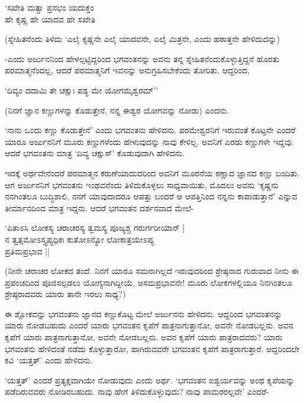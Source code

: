 \begin{shloka}
`ಸಖೇತಿ ಮತ್ವಾ ಪ್ರಸಭಂ ಯದುಕ್ತಂ\\
ಹೇ ಕೃಷ್ಣ ಹೇ ಯಾದವ ಹೇ ಸಖೇತಿ
\end{shloka}

(ಸ್ನೇಹಿತನೆಂದು ತಿಳಿದು `ಎಲೈ ಕೃಷ್ಣನೇ ಎಲೈ ಯಾದವನೇ, ಎಲೈ ಮಿತ್ರನೇ, ಎಂದು ಹಠಾತ್ತನೇ ಹೇಳಿದುದನ್ನು)

-ಎಂದು ಅರ್ಜುನನಿಂದ ಹೇಳಲ್ಪಟ್ಟಿದ್ದರಿಂದ ಭಗವಂತನನ್ನು ಅವನು ತನ್ನ ಸ್ನೇಹಿತನೆಂದುಕೊಳ್ಳುತ್ತಿದ್ದನೆ ಹೊರತು ಪರಮಾತ್ಮನೆಂದಲ್ಲ, ಆದರೆ ಪರಮಾತ್ಮನಿಗೆ ಇವನನ್ನು ಅನುಗ್ರಹಿಸಬೇಕೆಂದು ತೋರಿತು. ಆದ್ದರಿಂದ,

\begin{shloka}
`ದಿವ್ಯಂ ದದಾಮಿ ತೇ ಚಕ್ಷುಃ ಪಶ್ಯ ಮೇ ಯೋಗಮೈಶ್ವರಮ್''
\end{shloka}

(ನಿನಗೆ ಜ್ಞಾನ ಕಣ್ಣುಗಳನ್ನು ಕೊಡುತ್ತೇನೆ, ನನ್ನ ಈಶ್ವರ ಯೋಗವನ್ನು ನೋಡು) ಎಂದನು.

`ನಾನು ಒಂದು ಕಣ್ಣು ಕೊಡುತ್ತೇನೆ' ಎಂದು ಭಗವಂತನು ಹೇಳಿದನು. ಪರಮೇಶ್ವರನಿಗೆ ಇರುವಂತೆ ಕೊಟ್ಟನೇ ಎಂದರೆ ಯಾರೂ ಅರ್ಜುನನಿಗೆ ಮೂರು ಕಣ್ಣುಗಳೆಂದು ಹೇಳುವುದನ್ನು ನಾವು ಕೇಳಿಲ್ಲ. ಅವನಿಗೆ ಎರಡು ಕಣ್ಣುಗಳೇ ಇದ್ದವು. ಆದರೆ ಭಗವಂತನು ಮಾತ್ರ `ದಿವ್ಯ ಚಕ್ಷುಸ್' ಕೊಡುವುದಾಗಿ ಹೇಳಿದನು.

ಇದಕ್ಕೆ ಅರ್ಥವೇನೆಂದರೆ ಪರಮಾತ್ಮನ ಕರುಣೆಯಾದುದರಿಂದ ಅವನಿಗೆ ಮೂರನೆಯ ಕಣ್ಣಾದ ಜ್ಞಾನದ ಕಣ್ಣು ಬಂದಿತು. ಆಗ ಅರ್ಜುನನಿಗೆ ಭಗವಂತನು ಇಂಥವನೆಂದು ತಿಳಿದುಕೊಳ್ಳಲು ಸಾಧ್ಯವಾಯಿತು, ಮೊದಲು ಅವನು `ಕೃಷ್ಣನು ನನಗಿಂತಲೂ ಬುದ್ಧಿಶಾಲಿ, ನನಗೆ ಯಾವುದಾದರೂ ಆಪತ್ತು ಬಂದರೆ ಆ ಆಪತ್ತಿನಿಂದ ನನ್ನನು ಕಾಪಾಡುತ್ತಾನೆ' ಎನ್ನುವ ತೀರ್ಮಾನದಿಂದ ಮಾತ್ರ ಇದ್ದನು. ಆದರೆ ಭಗವಂತನ ದರ್ಶನವಾದ ಮೇಲೆ-

\begin{shloka}
`ಪಿತಾಽಸಿ ಲೋಕಸ್ಯ ಚರಾಚರಸ್ಯ ತ್ವಮಸ್ಯ ಪೂಜ್ಯಶ್ಚ ಗರುರ್ಗರೀಯಾನ್ |\\
ನ ತ್ವತ್ಸಮೋಽಸ್ತ್ಯಪ್ಯಧಿಕಃ ಕುತೋಽನ್ಯೋ ಲೋಕಾತ್ರಯೇಽಪ್ಯ\\
\hspace{5.3cm} ಪ್ರತಿಮಪ್ರಭಾವ ||
\end{shloka}

(ನೀನೇ ಚರಾಚರ ಲೋಕದ ತಂದೆ. ನಿನಗೆ ಯಾರೂ ಸಮನಾಗಿಲ್ಲದೆ ಇರುವುದರಿಂದ ಶ್ರೇಷ್ಠನಾದ ಗುರುವಾದ ನೀನು ಈ ಪ್ರಪಂಚದಿಂದ ಪೂಜಿಸಲ್ಪಡಲು ಯೋಗ್ಯನಾಗಿದ್ದೀಯೆ, ಅಸಮಪ್ರಭಾವನೇ! ಮೂರು ಲೋಕಗಳಲ್ಲಿಯೂ ನಿನಗಿಂತಲೂ ಶ್ರೇಷ್ಠರಾದವರು ಯಾರು ತಾನೇ ಇರಲು ಸಾಧ್ಯ?)

ಈ ಶ್ಲೋಕವನ್ನು ಭಗವಂತನು ಜ್ಞಾನದ ಕಣ್ಣುಕೊಟ್ಟ ಮೇಲೆ ಅರ್ಜುನನು ಹೇಳಿದನು. ಆದ್ದರಿಂದ ಭಗವಂತನನ್ನು ಯಾರು ನೋಡಬಹುದು ಎಂದರೆ ಯಾರು ಭಗವಂತನ ಕೃಪೆಗೆ ಪಾತ್ರನಾಗುತ್ತಾನೋ, ಅವನೇ ನೋಡಬಲ್ಲನು. ಅವನ ಕೃಪೆಗೆ ಯಾರು ಪಾತ್ರನಾಗುತ್ತಾನೋ, ಅವನೇ ನೋಡಬಲ್ಲನು. ಅವನ ಕೃಪೆಗೆ ಯಾರು ಪಾತ್ರರಾದವರು? ಯಾರು ಭಗವಂತನು ಹೇಳಿದಂತೆ ನಡೆದು ಕೊಳ್ಳುತ್ತಾರೋ, ಹಾಗಿರುವವರೇ ಭಗವಂತನ ಕೃಪೆಗೆ ಪಾತ್ರರಾಗುತ್ತಾರೆ. ಆದ್ದರಿಂದಲೇ ಕವಿ `ಯತ್ತತ್' ಎಂದು ಹೇಳಿದನು.

`ಯತ್ತತ್' ಎಂದರೆ ಪ್ರತ್ಯಕ್ಷವಾಗಿಯೇ ನೋಡುವುದು ಎಂದು ಅರ್ಥ. `ಭಗವಂತನ ಐಶ್ವರ್ಯವನ್ನು ಅಂಥ ಕೃಪೆಯನ್ನು ಪಡೆದಿರುವವರು ನೋಡಿರಬಹುದು. ನಾವು ಹೇಗೆ ತಿಳಿದುಕೊಳ್ಳುವುದು? ನಾವು ಪಾಮರರಲ್ಲವೇ' ಎಂದರೆ-

